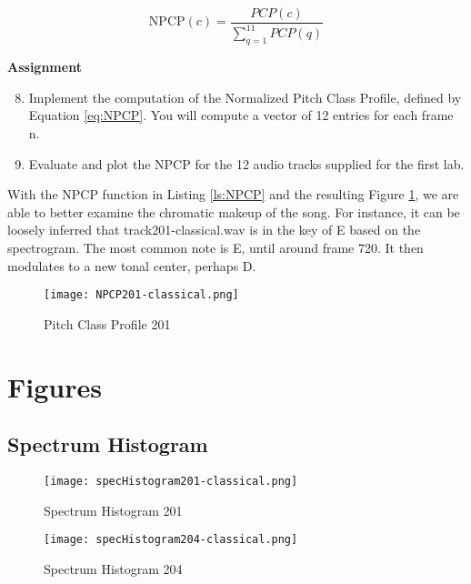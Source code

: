 \documentclass{article} %
\begin{document}
\begin{equation}
\label{eq:NPCP}
\text{NPCP}(c)=\frac{PCP(c)}{\sum\limits_{q=1}^{11}PCP(q)}
\end{equation}


\begin{framed}
\textbf{Assignment}
\begin{enumerate}
\setcounter{enumi}{7}
\item Implement the computation of the Normalized Pitch Class Profile, defined by Equation \ref{eq:NPCP}. You will compute a vector of 12 entries for each frame n.
\item Evaluate and plot the NPCP for the 12 audio tracks supplied for the first lab. 
\end{enumerate}
\end{framed}

With the NPCP function in Listing \ref{ls:NPCP} and the resulting Figure \ref{fig:NPCP201}, we are able to better examine the chromatic makeup of the song. 
For instance, it can be loosely inferred that track201-classical.wav is in the key of E based on the spectrogram. The most common note is E, until around frame 720.
It then modulates to a new tonal center, perhaps D. 
 

\begin{figure}[H]
\centering
\texttt{[image: NPCP201-classical.png]}
\caption{Pitch Class Profile 201}
\label{fig:NPCP201}
\end{figure}

\clearpage
\appendix
\section{Figures}
\subsection{Spectrum Histogram}
\label{sec:specHis}

\begin{figure}[H]
\centering
\texttt{[image: specHistogram201-classical.png]}
\caption{Spectrum Histogram 201}
\label{fig:hist201}
\end{figure}

\begin{figure}[H]
\centering
\texttt{[image: specHistogram204-classical.png]}
\caption{Spectrum Histogram 204}
\label{fig:hist204}
\end{figure}
\end{document}

